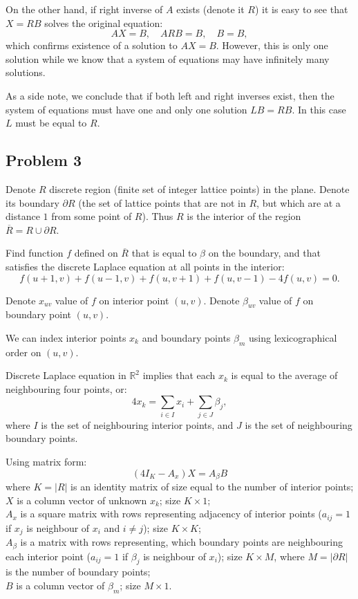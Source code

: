 \documentclass{article}
\begin{document}
On the other hand, if right inverse of $A$ exists (denote it $R$) it is easy to see that $X = RB$ solves the original equation:
\[ A X = B, \quad A R B = B, \quad B = B, \]
which confirms existence of a solution to $AX=B$.
However, this is only one solution while we know that a system of equations may have infinitely many solutions. 

As a side note, we conclude that if both left and right inverses exist, then the system of equations must have one and only one solution $LB = RB$.
In this case $L$ must be equal to $R$.


\subsection*{Problem 3}

\begin{tcolorbox}
Denote $R$ discrete region (finite set of integer lattice points) in the plane. Denote its boundary $\partial R$ (the set of lattice points that are not in $R$, but which are at a distance $1$ from some point of $R$).
Thus $R$ is the interior of the region $\overline{R} = R \cup \partial R$.

Find function $f$ defined on $\overline{R}$ that is equal to $\beta$ on the boundary, and that satisfies the discrete Laplace equation at all points in the interior:
\[ f(u+1,v) + f(u-1,v) + f(u,v+1)+f(u,v-1) - 4f(u,v) = 0. \]

Denote $x_{uv}$ value of $f$ on interior point $(u,v)$.
Denote $\beta_{uv}$ value of $f$ on boundary point $(u,v)$.
\end{tcolorbox}

We can index interior points $x_{k}$ and boundary points $\beta_{m}$ using lexicographical order on $(u,v)$.

Discrete Laplace equation in $\mathbb{R}^2$ implies that each $x_{k}$ is equal to the average of neighbouring four points, or:
\[ 4 x_{k} = \sum_{i \in I} x_i + \sum_{j \in J} \beta_j, \]
where $I$ is the set of neighbouring interior points, and $J$ is the set of neighbouring boundary points. 

Using matrix form:
\[ (4 I_{K} - A_x) X = A_\beta B \]
where $K = |R|$ is an identity matrix of size equal to the number of interior points; \\
$X$ is a column vector of unknown $x_{k}$; size $K \times 1$;\\
$A_x$ is a square matrix with rows representing adjacency of interior points ($a_{ij} = 1$ if $x_j$ is neighbour of $x_i$ and $i \neq j$); size $K \times K$; \\
$A_\beta$ is a matrix with rows representing, which boundary points are neighbouring each interior point ($a_{ij} = 1$ if $\beta_j$ is neighbour of $x_i$); size $K \times M$, where $M = |\partial R|$ is the number of boundary points; \\
$B$ is a column vector of $\beta_{m}$; size $M \times 1$.
\end{document}
